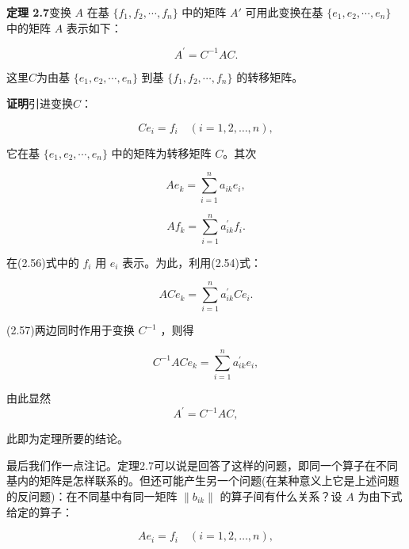 \textbf{定理 2.7}\quad 变换 $A$ 在基 $\{f_{1}, f_{2}, \cdots, f_{n}\}$ 中的矩阵 $A'$ 可用此变换在基 $\{e_{1}, e_{2}, \cdots, e_{n}\}$ 中的矩阵 $A$ 表示如下：

\begin{equation*}
A ^ {\prime} = C ^ {- 1} A C.\tag{2.53}
\end{equation*}

这里$C$为由基 $\{e_{1}, e_{2}, \cdots, e_{n}\}$ 到基 $\{f_{1}, f_{2}, \cdots, f_{n}\}$ 的转移矩阵。

\textbf{证明}\quad 引进变换$C$：

\begin{equation*}
C e _ {i} = f _ {i} \quad (i = 1, 2, \dots , n),\tag{2.54}
\end{equation*}

它在基 $\{e_{1}, e_{2}, \cdots, e_{n}\}$ 中的矩阵为转移矩阵 $C$。其次

\begin{equation*}
A e _ {k} = \sum_ {i = 1} ^ {n} a _ {i k} e _ {i},\tag{2.55}
\end{equation*}

\begin{equation*}
A f _ {k} = \sum_ {i = 1} ^ {n} a _ {i k} ^ {\prime} f _ {i}.\tag{2.56}
\end{equation*}

在(2.56)式中的 $f_{i}$ 用 $e_{i}$ 表示。为此，利用(2.54)式：

\begin{equation*}
A C e _ {k} = \sum_ {i = 1} ^ {n} a _ {i k} ^ {\prime} C e _ {i}.\tag{2.57}
\end{equation*}

(2.57)两边同时作用于变换 $C^{-1}$ ，则得

\begin{equation*}
C ^ {- 1} A C e _ {k} = \sum_ {i = 1} ^ {n} a _ {i k} ^ {\prime} e _ {i},\tag{2.58}
\end{equation*}

由此显然
\begin{equation*}
A ^ {\prime} = C ^ {- 1} A C,
\end{equation*}

此即为定理所要的结论。

最后我们作一点注记。定理2.7可以说是回答了这样的问题，即同一个算子在不同基内的矩阵是怎样联系的。但还可能产生另一个问题(在某种意义上它是上述问题的反问题)：在不同基中有同一矩阵 $\| b_{ik}\|$ 的算子间有什么关系？设 $A$ 为由下式给定的算子：

\begin{equation*}
A e _ {i} = f _ {i} \quad (i = 1, 2, \dots , n),\tag{2.59}
\end{equation*}

